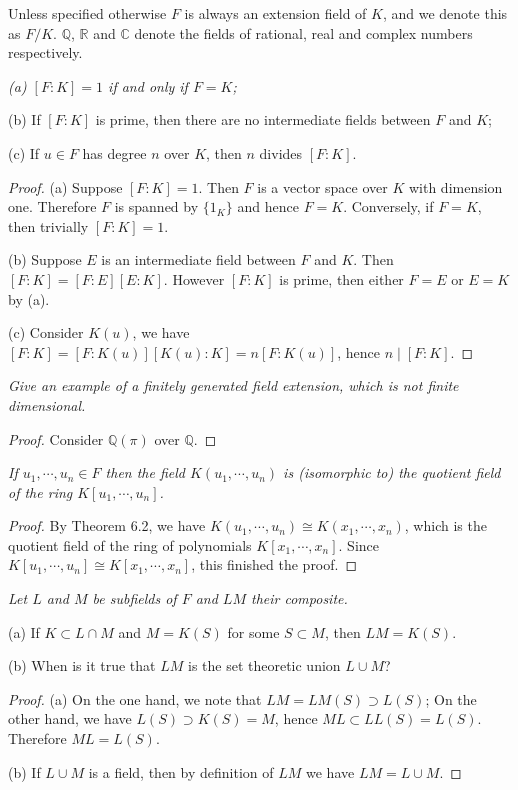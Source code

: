 Unless specified otherwise $F$ is always an extension field of $K$, and we denote this as $F/K$. $\mathbb{Q}$, $\mathbb{R}$ and $\mathbb{C}$ denote the fields of rational, real and complex numbers respectively.
\begin{problem}\em
(a) $[F:K]=1$ if and only if $F=K$;\par
(b) If $[F:K]$ is prime, then there are no intermediate fields between $F$ and $K$;\par
(c) If $u\in F$ has degree $n$ over $K$, then $n$ divides $[F:K]$.
\end{problem}
\begin{proof}
(a) Suppose $[F:K]=1$. Then $F$ is a vector space over $K$ with dimension one. Therefore $F$ is spanned by $\{1_K\}$ and hence $F=K$. Conversely, if $F=K$, then trivially $[F:K]=1$.\par
(b) Suppose $E$ is an intermediate field between $F$ and $K$. Then $[F:K]=[F:E][E:K]$. However $[F:K]$ is prime, then either $F=E$ or $E=K$ by (a).\par
(c) Consider $K(u)$, we have $[F:K]=[F:K(u)][K(u):K]=n[F:K(u)]$, hence $n\mid[F:K]$.
\end{proof}
\begin{problem}\em
Give an example of a finitely generated field extension, which is not finite dimensional.
\end{problem}
\begin{proof}
Consider $\mathbb{Q}(\pi)$ over $\mathbb{Q}$.
\end{proof}
\begin{problem}\em
If $u_1,\cdots,u_n\in F$ then the field $K(u_1,\cdots,u_n)$ is (isomorphic to) the quotient field of the ring $K[u_1,\cdots,u_n]$.
\end{problem}
\begin{proof}
By Theorem 6.2, we have $K(u_1,\cdots,u_n)\cong K(x_1,\cdots,x_n)$, which is the quotient field of the ring of polynomials $K[x_1,\cdots,x_n]$. Since $K[u_1,\cdots,u_n]\cong K[x_1,\cdots,x_n]$, this finished the proof.
\end{proof}
\begin{problem}\em
Let $L$ and $M$ be subfields of $F$ and $LM$ their composite.\par
(a) If $K\subset L\cap M$ and $M=K(S)$ for some $S\subset M$, then $LM=K(S)$.\par
(b) When is it true that $LM$ is the set theoretic union $L\cup M$?
\end{problem}
\begin{proof}
(a) On the one hand, we note that $LM=LM(S)\supset L(S)$; On the other hand, we have $L(S)\supset K(S)=M$, hence $ML\subset LL(S)=L(S)$. Therefore $ML=L(S)$.\par
(b) If $L\cup M$ is a field, then by definition of $LM$ we have $LM=L\cup M$.
\end{proof}
